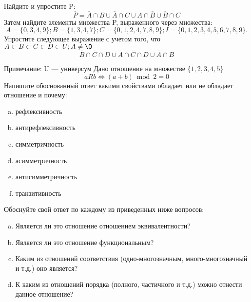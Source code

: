 \documentclass[10pt]{exam}
\begin{document}
\begin{questions}
\question
Найдите и упростите P:
\begin{equation*}
\overline{P} = \overline{A} \cap B \cup \overline{A} \cap C \cup A \cap \overline{B} \cup \overline{B} \cap C
\end{equation*}
Затем найдите элементы множества P, выраженного через множества:
\begin{equation*}
A = \{0, 3, 4, 9\}; 
B = \{1, 3, 4, 7\};
C = \{0, 1, 2, 4, 7, 8, 9\};
I = \{0, 1, 2, 3, 4, 5, 6, 7, 8, 9\}.
\end{equation*}\question
Упростите следующее выражение с учетом того, что $A\subset B \subset C \subset D \subset U; A \neq \O$
\begin{equation*}
\overline{B} \cap \overline{C} \cap D \cup \overline{A} \cap \overline{C} \cap D \cup \overline{A} \cap B
\end{equation*}

Примечание: U — универсум\question
Дано отношение на множестве $\{1, 2, 3, 4, 5\}$ 
\begin{equation*}
aRb \iff (a+b) \bmod 2 =0
\end{equation*}
Напишите обоснованный ответ какими свойствами обладает или не обладает отношение и почему:   
\begin{enumerate} [a)]\setcounter{enumi}{0}
\item рефлексивность
\item антирефлексивность
\item симметричность
\item асимметричность
\item антисимметричность
\item транзитивность
\end{enumerate}

Обоснуйте свой ответ по каждому из приведенных ниже вопросов:
\begin{enumerate} [a)]\setcounter{enumi}{0}
    \item Является ли это отношение отношением эквивалентности?
    \item Является ли это отношение функциональным?
    \item Каким из отношений соответствия (одно-многозначным, много-многозначный и т.д.) оно является?
    \item К каким из отношений порядка (полного, частичного и т.д.) можно отнести данное отношение?
\end{enumerate}




\end{questions}
\end{document}
